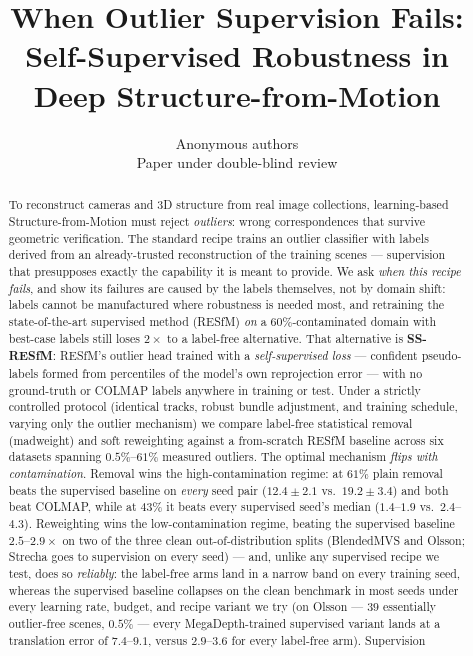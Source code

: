 \documentclass{article}
\title{When Outlier Supervision Fails:\\
Self-Supervised Robustness in Deep Structure-from-Motion}
\author{Anonymous authors\\Paper under double-blind review}
\newcommand{\mad}{madweight}
\begin{document}
\maketitle

\begin{abstract}
To reconstruct cameras and 3D structure from real image collections, learning-based
Structure-from-Motion must reject \emph{outliers}: wrong correspondences that survive
geometric verification. The standard recipe trains an outlier classifier with labels
derived from an already-trusted reconstruction of the training scenes --- supervision
that presupposes exactly the capability it is meant to provide. We ask \emph{when this
recipe fails}, and show its failures are caused by the labels themselves, not by domain
shift: labels cannot be manufactured where robustness is needed most, and retraining the
state-of-the-art supervised method (RESfM) \emph{on} a $60\%$-contaminated domain with
best-case labels still loses $2\times$ to a label-free alternative. That alternative is
\textbf{SS-RESfM}: RESfM's outlier head trained with a \emph{self-supervised loss} ---
confident pseudo-labels formed from percentiles of the model's own reprojection error ---
with no ground-truth or COLMAP labels anywhere in training or test. Under a strictly controlled protocol (identical tracks, robust bundle adjustment,
and training schedule, varying only the outlier mechanism) we compare label-free
statistical removal (\mad{}) and soft reweighting against a from-scratch RESfM baseline
across six datasets spanning $0.5\%$--$61\%$ measured outliers. The optimal mechanism
\emph{flips with contamination}. Removal wins the high-contamination regime: at $61\%$
plain removal beats the supervised baseline on \emph{every} seed pair
($12.4\pm2.1$ vs.\ $19.2\pm3.4$) and both beat COLMAP, while at $43\%$ it beats every
supervised seed's median ($1.4$--$1.9$ vs.\ $2.4$--$4.3$). Reweighting wins the low-contamination regime, beating
the supervised baseline $2.5$--$2.9\times$ on two of the three clean out-of-distribution
splits (BlendedMVS and Olsson; Strecha goes to supervision on every seed) --- and,
unlike any supervised recipe we test, does so \emph{reliably}: the label-free arms land
in a narrow band on every training seed, whereas the supervised baseline collapses on
the clean benchmark in most seeds under every learning rate, budget, and recipe variant
we try (on Olsson --- $39$ essentially outlier-free scenes, $0.5\%$ --- every
MegaDepth-trained supervised variant lands at a translation error of $7.4$--$9.1$,
versus $2.9$--$3.6$ for every label-free arm). Supervision

\end{abstract}
\end{document}
